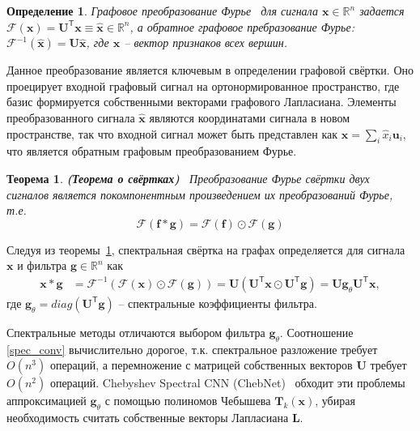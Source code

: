 \documentclass[14pt]{extarticle}
\newtheorem{Th}{Теорема}
\newtheorem{Def}{Определение}
\begin{document}
\begin{Def}
	\textit{Графовое преобразование Фурье}~\cite{journals/spm/ShumanNFOV13} для сигнала $\mathbf{x} \in \mathbb{R}^{n}$ задается $\mathscr{F}(\mathbf{x})=\mathbf{U}^{\mathsf{T}} \mathbf{x} \equiv \hat{\mathbf{x}} \in \mathbb{R}^{n}$, а обратное графовое пребразование Фурье: $\mathscr{F}^{-1}(\hat{\mathbf{x}})=\mathbf{U} \hat{\mathbf{x}}$, где $\mathbf{x}$ -- вектор признаков всех вершин.
\end{Def}

Данное преобразование является ключевым в определении графовой свёртки. Оно проецирует входной графовый сигнал на ортонормированное пространство, где базис формируется собственными векторами графового Лапласиана. Элементы преобразованного сигнала $ \hat{\mathbf{x}}$ являются координатами сигнала в новом пространстве, так что входной сигнал может быть представлен как $\mathbf{x}=\sum_{i} \hat{x}_{i} \mathbf{u}_{i}$, что является обратным графовым преобразованием Фурье.

\begin{Th}
	\textbf{(Теорема о свёртках)}~\cite{10.5555/1525499} Преобразование Фурье свёртки двух сигналов является покомпонентным произведением их преобразований Фурье, т.е. $$\mathscr{F}\left( \mathbf{f} * \mathbf{g}\right) =\mathscr{F}(\mathbf{f}) \odot \mathscr{F}(\mathbf{g})$$
	\label{conv_theorem}
\end{Th}

Следуя из теоремы~\ref{conv_theorem}, спектральная свёртка на графах определяется для сигнала $\mathbf{x}$ и фильтра $\mathbf{g} \in \mathbb{R}^{n}$ как 
\begin{align}
\mathbf{x} * \mathbf{g} &=\mathscr{F}^{-1}(\mathscr{F}(\mathbf{x}) \odot \mathscr{F}(\mathbf{g})) =\mathbf{U}\left(\mathbf{U}^{\mathsf{T}} \mathbf{x} \odot \mathbf{U}^{\mathsf{T}} \mathbf{g}\right) = \mathbf{U g}_{\theta} \mathbf{U}^{\mathsf{T}} \mathbf{x},\label{spec_conv}
\end{align}
где $\mathbf{g}_{\theta} = diag\left(\mathbf{U}^{\mathsf{T}} \mathbf{g}\right)$ -- спектральные коэффициенты фильтра.

Спектральные методы отличаются выбором фильтра $\mathbf{g}_{\theta}$. Соотношение \ref{spec_conv} вычислительно дорогое, т.к. спектральное разложение требует $O\left(n^{3}\right)$ операций, а перемножение с матрицей собственных векторов $\mathbf{U}$ требует $O\left(n^{2}\right)$ операций. Chebyshev Spectral CNN (ChebNet)~\cite{NIPS2016_6081} обходит эти проблемы аппроксимацией $\mathbf{g}_{\theta}$ с помощью полиномов Чебышева $\mathbf{T}_k\mathbf{(x)}$, убирая необходимость считать собственные векторы Лапласиана $\mathbf{L}$.
\end{document}
